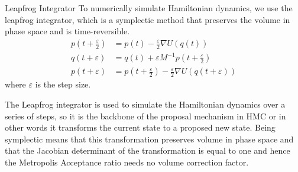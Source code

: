 \begin{frame}{Leapfrog Integrator}
	To numerically simulate Hamiltonian dynamics, we use the leapfrog integrator, which is a
	symplectic method that preserves the volume in phase space and is time-reversible.
	\begin{align*}
		p\left(t + \frac{\varepsilon}{2}\right) & = p(t) - \frac{\varepsilon}{2} \nabla U(q(t))                                                  \\
		q(t + \varepsilon)                      & = q(t) + \varepsilon M^{-1} p\left(t + \frac{\varepsilon}{2}\right)                            \\
		p(t + \varepsilon)                      & = p\left(t + \frac{\varepsilon}{2}\right) - \frac{\varepsilon}{2} \nabla U(q(t + \varepsilon))
	\end{align*}
	where $\varepsilon$ is the step size.

	The Leapfrog integrator is used to simulate the Hamiltonian dynamics over a series of steps, so it
	is the backbone of the proposal mechanism in HMC or in other words it transforms the current state
	to a proposed new state. Being symplectic means that this transformation preserves volume in phase space and
	that the Jacobian determinant of the transformation is equal to one and hence the Metropolis
	Acceptance ratio needs no volume correction factor.
\end{frame}



